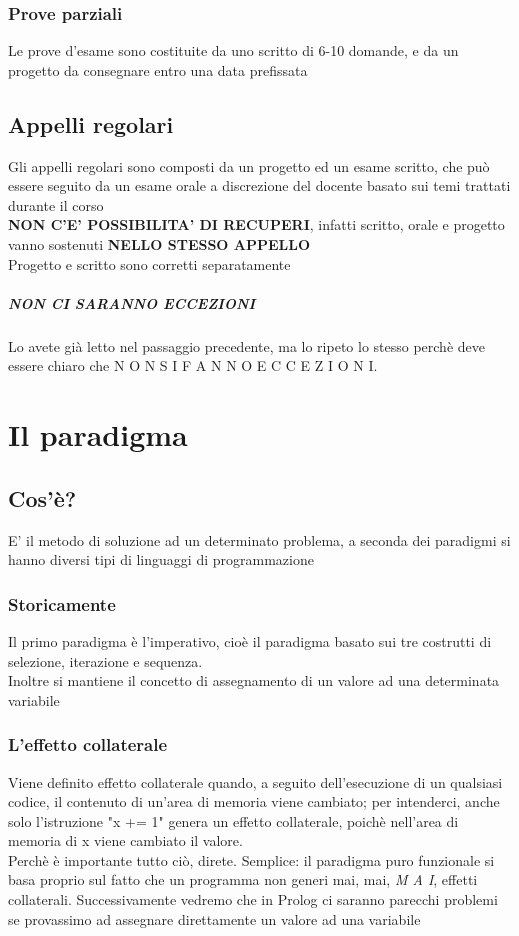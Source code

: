 \documentclass[12pt, a4paper, openany, oneside]{book}
\begin{document}
{\subsection{Prove parziali}
\label{sub:prove_parziali}
Le prove d'esame sono costituite da uno scritto di 6-10 domande, e da un 
progetto da consegnare entro una data prefissata
\section{Appelli regolari}
\label{sec:appelli_regolari}
Gli appelli regolari sono composti da un progetto ed un esame scritto, che può
essere seguito da un esame orale a discrezione del docente basato sui temi 
trattati durante il corso
\\
\textbf{NON C'E' POSSIBILITA' DI RECUPERI}, infatti scritto, orale e progetto 
vanno sostenuti \color{red} \textbf{NELLO STESSO APPELLO} \color{black}
\\
Progetto e scritto sono corretti separatamente
\paragraph{NON CI SARANNO ECCEZIONI}
\label{par:non_ci_saranno_eccezioni}
Lo avete già letto nel passaggio precedente, ma lo ripeto lo stesso perchè 
deve essere chiaro che N O N  S I  F A N N O  E C C E Z I O N I.
\chapter{Il paradigma}
\section{Cos'è?}
E' il metodo di soluzione ad un determinato problema, a seconda dei paradigmi si
hanno diversi tipi di linguaggi di programmazione
\subsection{Storicamente}
Il primo paradigma è l'imperativo, cioè il paradigma basato sui tre costrutti
di selezione, iterazione e sequenza. \\
Inoltre si mantiene il concetto di assegnamento di un valore ad una determinata variabile
\subsection{L'effetto collaterale}
Viene definito effetto collaterale quando, a seguito dell'esecuzione di un qualsiasi
codice, il contenuto di un'area di memoria viene cambiato; per intenderci, anche
solo l'istruzione "x += 1" genera un effetto collaterale, poichè nell'area di 
memoria di x viene cambiato il valore. \\
Perchè è importante tutto ciò, direte. Semplice: il paradigma puro funzionale si 
basa proprio sul fatto che un programma non generi mai, mai, \emph{M A I}, effetti 
collaterali.
Successivamente vedremo che in Prolog ci saranno parecchi problemi se provassimo
ad assegnare direttamente un valore ad una variabile
}
\end{document}
